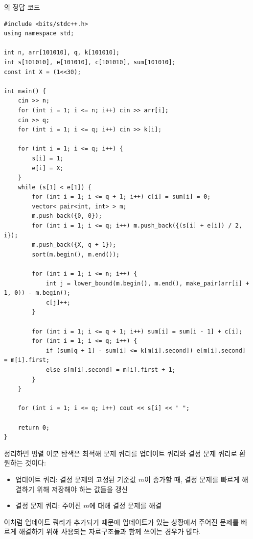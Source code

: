 \begin{code} \label{code: parallel-binary-search}
의 정답 코드
\begin{lstlisting}
#include <bits/stdc++.h>
using namespace std;

int n, arr[101010], q, k[101010];
int s[101010], e[101010], c[101010], sum[101010];
const int X = (1<<30);

int main() {
    cin >> n;
    for (int i = 1; i <= n; i++) cin >> arr[i];
    cin >> q;
    for (int i = 1; i <= q; i++) cin >> k[i];

    for (int i = 1; i <= q; i++) {
        s[i] = 1;
        e[i] = X;
    }
    while (s[1] < e[1]) {
        for (int i = 1; i <= q + 1; i++) c[i] = sum[i] = 0;
        vector< pair<int, int> > m;
        m.push_back({0, 0});
        for (int i = 1; i <= q; i++) m.push_back({(s[i] + e[i]) / 2, i});
        m.push_back({X, q + 1});
        sort(m.begin(), m.end());

        for (int i = 1; i <= n; i++) {
            int j = lower_bound(m.begin(), m.end(), make_pair(arr[i] + 1, 0)) - m.begin();
            c[j]++;
        }

        for (int i = 1; i <= q + 1; i++) sum[i] = sum[i - 1] + c[i];
        for (int i = 1; i <= q; i++) {
            if (sum[q + 1] - sum[i] <= k[m[i].second]) e[m[i].second] = m[i].first;
            else s[m[i].second] = m[i].first + 1;
        }
    }

    for (int i = 1; i <= q; i++) cout << s[i] << " ";

    return 0;
}
\end{lstlisting}
\end{code}

정리하면 병렬 이분 탐색은 최적해 문제 쿼리를 업데이트 쿼리와 결정 문제 쿼리로 환원하는 것이다:
\begin{itemize}
    \item 업데이트 쿼리: 결정 문제의 고정된 기준값 $m$이 증가할 때, 결정 문제를 빠르게 해결하기 위해 저장해야 하는 값들을 갱신
    \item 결정 문제 쿼리: 주어진 $m$에 대해 결정 문제를 해결
\end{itemize}

이처럼 업데이트 쿼리가 추가되기 때문에 업데이트가 있는 상황에서 주어진 문제를 빠르게 해결하기 위해 사용되는 자료구조들과 함께 쓰이는 경우가 많다.

